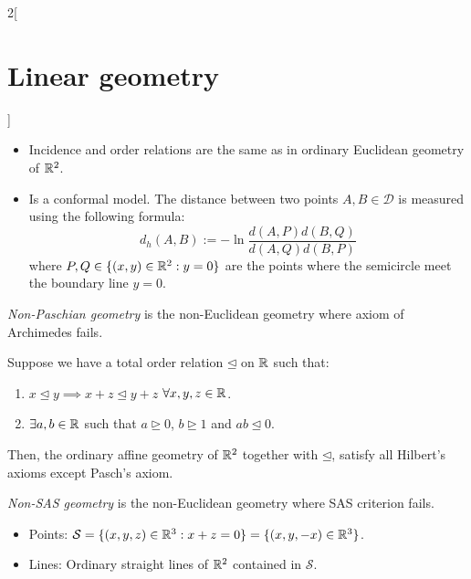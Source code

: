 \documentclass[../../../main_math.tex]{subfiles}
\begin{document}
\begin{multicols}{2}[\section{Linear geometry}]
\begin{definition}
\begin{itemize}
\begin{itemize}
              \item Incidence and order relations are the same as in ordinary Euclidean geometry of $\mathbb{R}^2$.
              \item Is a conformal model. The distance between two points $A,B\in\mathcal{D}$ is measured using the following formula: $$d_h(A,B):=-\ln\frac{d(A,P)d(B,Q)}{d(A,Q)d(B,P)}$$ where $P,Q\in\{(x,y)\in\mathbb{R}^2:y=0\}$ are the points where the semicircle meet the boundary line $y=0$.
            \end{itemize}
            \begin{center}
              \begin{minipage}{\linewidth}
                \centering
                
              \end{minipage}
            \end{center}
    \end{itemize}
  \end{definition}
  \begin{definition}
    \emph{Non-Paschian geometry} is the non-Euclidean geometry where axiom of Archimedes fails.
  \end{definition}
  \begin{proposition}
    Suppose we have a total order relation $\unlhd$ on $\mathbb{R} $ such that:
    \begin{enumerate}
      \item $x\unlhd y\implies x+z\unlhd y+z$ $\forall x,y,z\in\mathbb{R} $.
      \item $\exists a,b\in\mathbb{R}$ such that $a\unrhd 0$, $b\unrhd 1$ and $ab\unlhd 0$.
    \end{enumerate}
    Then, the ordinary affine geometry of $\mathbb{R}^2$ together with $\unlhd$, satisfy all Hilbert's axioms except Pasch's axiom.
  \end{proposition}
  \begin{definition}
    \emph{Non-SAS geometry} is the non-Euclidean geometry where SAS criterion fails.
  \end{definition}
  \begin{proposition}
    \hfill
    \begin{itemize}
      \item Points: $\mathcal{S}=\{(x,y,z)\in\mathbb{R}^3:x+z=0\}=\{(x,y,-x)\in\mathbb{R}^3\}$.
      \item Lines: Ordinary straight lines of $\mathbb{R}^2$ contained in $\mathcal{S}$.

\end{itemize}
\end{proposition}
\end{multicols}
\end{document}
